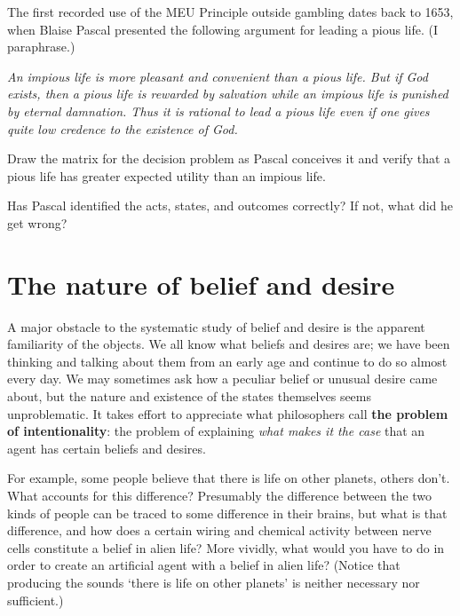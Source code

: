 \begin{exercise}{2}\label{e:pascal}
  The first recorded use of the MEU Principle outside gambling dates
  back to 1653, when Blaise Pascal presented the following argument
  for leading a pious life. (I paraphrase.)

  \emph{An impious life is more pleasant and convenient than a
    pious life. But if God exists, then a pious life is rewarded by
    salvation while an impious life is punished by eternal
    damnation. Thus it is rational to lead a pious life even if one
    gives quite low credence to the existence of God.}
  
  Draw the matrix for the decision problem as Pascal conceives it and
  verify that a pious life has greater expected utility than an
  impious life.
\end{exercise}

\begin{exercise}{2}
  Has Pascal identified the acts, states, and outcomes correctly? If
  not, what did he get wrong?
\end{exercise}



\section{The nature of belief and desire}

A major obstacle to the systematic study of belief and desire is the
apparent familiarity of the objects. We all know what beliefs and
desires are; we have been thinking and talking about them from an
early age and continue to do so almost every day. We may sometimes ask
how a peculiar belief or unusual desire came about, but the nature and
existence of the states themselves seems unproblematic. It takes
effort to appreciate what philosophers call \textbf{the problem of
  intentionality}: the problem of explaining \emph{what makes it the
  case} that an agent has certain beliefs and desires. 

For example, some people believe that there is life on other planets,
others don't. What accounts for this difference? Presumably the
difference between the two kinds of people can be traced to some
difference in their brains, but what is that difference, and how does
a certain wiring and chemical activity between nerve cells constitute
a belief in alien life? More vividly, what would you have to do in
order to create an artificial agent with a belief in alien life?
(Notice that producing the sounds `there is life on other planets' is
neither necessary nor sufficient.)

